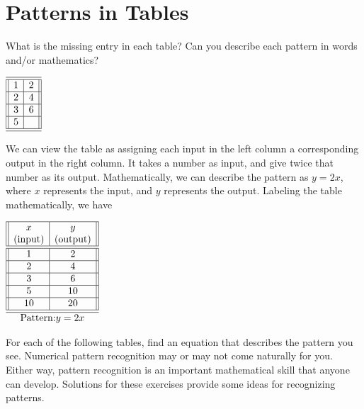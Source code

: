 \documentclass[nooutcomes]{ximera}
\begin{document}
\section{Patterns in Tables}
\begin{example}
What is the missing entry in each table? Can you describe each pattern in words and/or mathematics?

\begin{center}
\(
\begin{array}{||c|c||}
\hline 
\hline
1&2\\
\hline
2&4\\
\hline
3&6\\
\hline
5& \\
\hline 
\hline
\end{array}
\)
\end{center}



 \begin{explanation}
We can view the table as assigning each input in the left column a corresponding output in the right column. It takes a number as input, and give twice that number as its output. Mathematically, we can describe the pattern as $y=2x$, where $x$  represents the input, and $y$ represents the output. Labeling the table mathematically, we have

\begin{center}
\(
\begin{array}{||c|c||}
\hline
x&y\\
\text{(input)}&\text{(output)}\\
\hline 
\hline
1&2\\
\hline
2&4\\
\hline
3&6\\
\hline
5&10\\
\hline
10&20\\
\hline 
\hline
\multicolumn{2}{c}{\text{Pattern:}y=2x}\\
\end{array}
\)
\end{center}



\end{explanation}
\end{example}

For each of the following tables, find an equation that describes the pattern you see. Numerical pattern recognition may or may not come naturally for you. Either way, pattern recognition is an important mathematical skill that anyone can develop. Solutions for these exercises provide some ideas for recognizing patterns.
\end{document}
